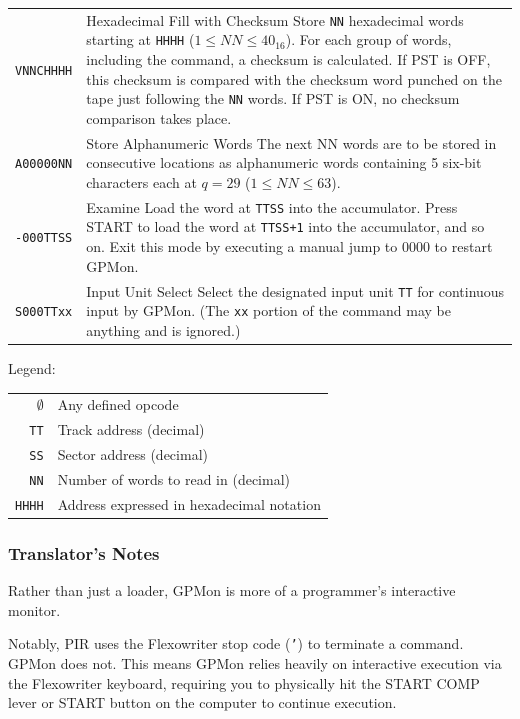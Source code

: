 \begin{longtable}{l p{9.5cm}}
\addlinespace
\texttt{VNNCHHHH} & Hexadecimal Fill with Checksum \newline Store \texttt{NN} hexadecimal words starting at \texttt{HHHH} ($1 \le NN \le 40_{16}$). For each group of words, including the command, a checksum is calculated. If \textsf{PST} is \textsf{OFF}, this checksum is compared with the checksum word punched on the tape just following the \texttt{NN} words. If \textsf{PST} is \textsf{ON}, no checksum comparison takes place. \\
\addlinespace
\texttt{A00000NN} & Store Alphanumeric Words \newline The next \textsf{NN} words are to be stored in consecutive locations as alphanumeric words containing 5 six-bit characters each at $q=29$ ($1 \le NN \le 63$). \\
\addlinespace
\texttt{-000TTSS} & Examine \newline Load the word at \texttt{TTSS} into the accumulator. Press \textsf{START} to load the word at \texttt{TTSS+1} into the accumulator, and so on. Exit this mode by executing a manual jump to 0000 to restart GPMon. \\
\addlinespace
\texttt{S000TTxx} & Input Unit Select \newline Select the designated input unit \texttt{TT} for continuous input by GPMon. (The \texttt{xx} portion of the command may be anything and is ignored.)
\end{longtable}

\noindent Legend:
\begin{center}
\begin{tabular}{rl}
\toprule
$\emptyset$ & Any defined opcode \\
\texttt{TT}  & Track address (decimal) \\
\texttt{SS}  & Sector address (decimal) \\
\texttt{NN}  & Number of words to read in (decimal) \\
\texttt{HHHH} & Address expressed in hexadecimal notation \\
\bottomrule
\end{tabular}
\end{center}

\subsubsection*{Translator's Notes}
Rather than just a loader, GPMon is more of a programmer's interactive monitor.

Notably, PIR uses the Flexowriter stop code (\texttt{'}) to terminate a command. GPMon does not. This means GPMon relies heavily on interactive execution via the Flexowriter keyboard, requiring you to physically hit the \textsf{START COMP} lever or \textsf{START} button on the computer to continue execution.